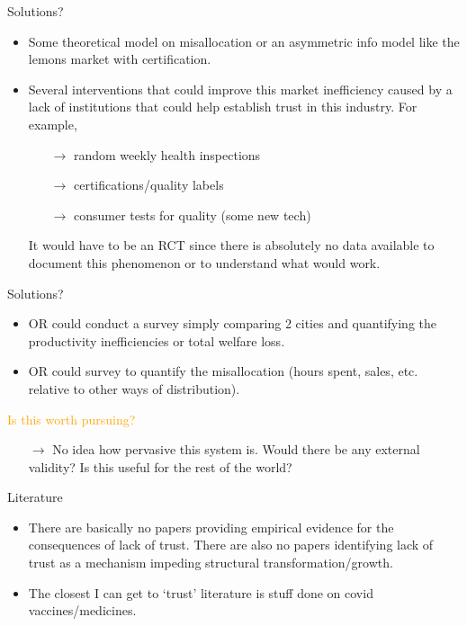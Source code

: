 \documentclass[12pt, aspectratio=169]{beamer}
\begin{document}
\begin{frame}{Solutions?}

\begin{itemize}
\item Some theoretical model on misallocation or an asymmetric info model like the lemons market with certification. 
\item Several interventions that could improve this market inefficiency caused by a lack of institutions that could help establish trust in this industry. For example,
\begin{itemize}
    \item [$\rightarrow$] random weekly health inspections
    \item [$\rightarrow$] certifications/quality labels
    \item [$\rightarrow$] consumer tests for quality (some new tech)
\end{itemize}
It would have to be an RCT since there is absolutely no data available to document this phenomenon or to understand what would work.
\end{itemize}
\end{frame}

\begin{frame}[noframenumbering] {Solutions?}

\begin{itemize}
\setcounter{enumi}{2} 
\item OR could conduct a survey simply comparing 2 cities and quantifying the productivity inefficiencies or total welfare loss. 
\item OR could survey to quantify the misallocation (hours spent, sales, etc. relative to other ways of distribution). 
\end{itemize}
\end{frame}


\begin{frame}{}
\textcolor{orange}{Is this worth pursuing?}
\begin{itemize}
    \item [$\rightarrow$] No idea how pervasive this system is. Would there be any external validity? Is this useful for the rest of the world?
\end{itemize}
\end{frame}


\begin{frame}{Literature}
\begin{itemize}
    \item There are basically no papers providing empirical evidence for the consequences of lack of trust. There are also no papers identifying lack of trust as a mechanism impeding structural transformation/growth. 
    \item The closest I can get to `trust' literature is stuff done on covid vaccines/medicines.
\end{itemize}
\end{frame}
\end{document}
